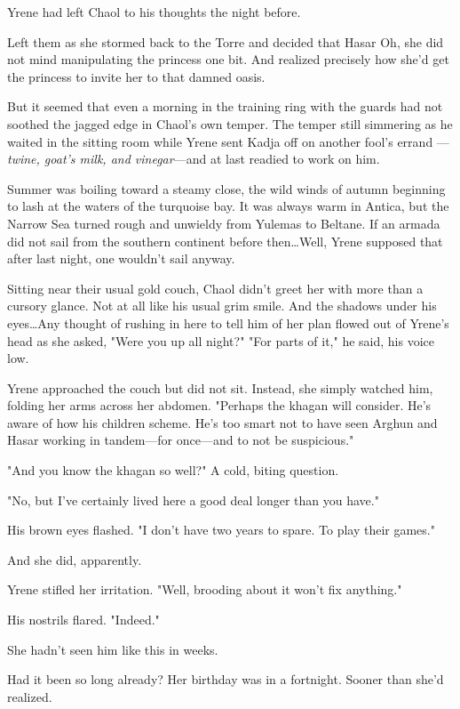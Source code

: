 Yrene had left Chaol to his thoughts the night before.

Left them as she stormed back to the Torre and decided that Hasar  Oh, she did not mind manipulating the princess one bit.
And realized precisely how she'd get the princess to invite her to that damned oasis.

But it seemed that even a morning in the training ring with the guards had not soothed the jagged edge in Chaol's own temper.
The temper still simmering as he waited in the sitting room while Yrene sent Kadja off on another fool's errand ---\emph{twine, goat's milk, and vinegar}---and at last readied to work on him.

Summer was boiling toward a steamy close, the wild winds of autumn beginning to lash at the waters of the turquoise bay.
It was always warm in Antica, but the Narrow Sea turned rough and unwieldy from Yulemas to Beltane.
If an armada did not sail from the southern continent before then\ldots Well, Yrene supposed that after last night, one wouldn't sail anyway.

Sitting near their usual gold couch, Chaol didn't greet her with more than a cursory glance.
Not at all like his usual grim smile.
And the shadows under his eyes\ldots Any thought of rushing in here to tell him of her plan flowed out of Yrene's head as she asked, "Were you up all night?"
"For parts of it," he said, his voice low.

Yrene approached the couch but did not sit.
Instead, she simply watched him, folding her arms across her abdomen.
"Perhaps the khagan will consider.
He's aware of how his children scheme.
He's too smart not to have seen Arghun and Hasar working in tandem---for once---and to not be suspicious."

"And you know the khagan so well?"
A cold, biting question.

"No, but I've certainly lived here a good deal longer than you have."

His brown eyes flashed.
"I don't have two years to spare.
To play their games."

And she did, apparently.

Yrene stifled her irritation.
"Well, brooding about it won't fix anything."

His nostrils flared.
"Indeed."

She hadn't seen him like this in weeks.

Had it been so long already?
Her birthday was in a fortnight.
Sooner than she'd realized.

